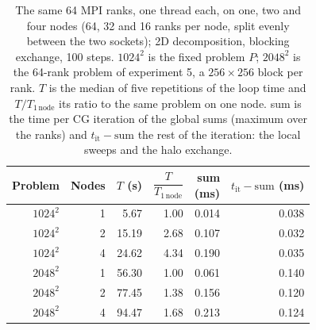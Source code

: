 \begin{table}[htbp]
\centering
\small
\begin{tabular}{rrrrrr}
\toprule
Problem & Nodes & \shortstack[r]{$T$\\(s)} & $\dfrac{T}{T_{1\,\mathrm{node}}}$ & \shortstack[r]{sum\\(ms)} & \shortstack[r]{$t_{\mathrm{it}}-\mathrm{sum}$\\(ms)} \\
\midrule
$1024^2$ & 1 & 5.67 & 1.00 & 0.014 & 0.038 \\
$1024^2$ & 2 & 15.19 & 2.68 & 0.107 & 0.032 \\
$1024^2$ & 4 & 24.62 & 4.34 & 0.190 & 0.035 \\
\midrule
$2048^2$ & 1 & 56.30 & 1.00 & 0.061 & 0.140 \\
$2048^2$ & 2 & 77.45 & 1.38 & 0.156 & 0.120 \\
$2048^2$ & 4 & 94.47 & 1.68 & 0.213 & 0.124 \\
\bottomrule
\end{tabular}
\caption{The same 64 MPI ranks, one thread each, on one, two and four nodes (64, 32 and 16 ranks per node, split evenly between the two sockets); 2D decomposition, blocking exchange, 100 steps. $1024^2$ is the fixed problem $P$; $2048^2$ is the 64-rank problem of experiment 5, a $256\times256$ block per rank. $T$ is the median of five repetitions of the loop time and $T/T_{1\,\mathrm{node}}$ its ratio to the same problem on one node. sum is the time per CG iteration of the global sums (maximum over the ranks) and $t_{\mathrm{it}}-\mathrm{sum}$ the rest of the iteration: the local sweeps and the halo exchange.}
\label{tab:node-spread}
\end{table}
